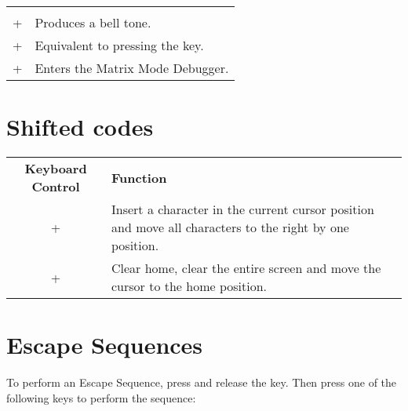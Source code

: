\begin{center}
\begin{longtable}{c|L{5.5cm}}
  \hhline{==}
   \\
  \hhline{==}

 +  &
Produces a bell tone.\\
\hline
{} + \megakey{[} &
Equivalent to pressing the  key.\\
\hline
{} + \megakey{*} &
Enters the Matrix Mode Debugger.\\
\hline

\end{longtable}
\end{center}


\section{Shifted codes}
\label{appendix:shiftedcodes}

\begin{center}
\begin{longtable}{c|L{5.5cm}}
	\textbf{Keyboard Control} & \textbf{Function}\\
  \hhline{==}
	\endhead

 +  &
Insert a character in the current cursor position and move all characters to the right by one position.\\
\hline
{} +  &
Clear home, clear the entire screen and move the cursor to the home position.\\
\hline

\end{longtable}
\end{center}



\section{Escape Sequences}
\label{appendix:escapesequences}

To perform an Escape Sequence, press and release the  key. Then press one of the following keys to perform the sequence:

